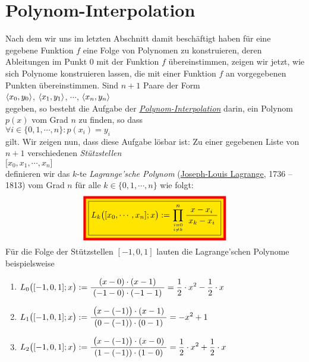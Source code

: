 \section{Polynom-Interpolation}
Nach dem wir uns im letzten Abschnitt damit besch\"aftigt haben f\"ur eine gegebene Funktion
$f$ eine Folge von Polynomen zu konstruieren, deren Ableitungen im Punkt $0$ mit der
Funktion $f$ \"ubereinstimmen, zeigen wir jetzt, wie sich Polynome konstruieren lassen, die
mit einer Funktion $f$ an vorgegebenen Punkten \"ubereinstimmen.  Sind $n+1$ Paare der Form
\\[0.2cm]
\hspace*{1.3cm}
$\pair(x_0,y_0)$,
$\pair(x_1,y_1)$,
$\cdots$,
$\pair(x_n,y_n)$
\\[0.2cm]
gegeben, so besteht die Aufgabe der
\href{https://de.wikipedia.org/wiki/Interpolation_(Mathematik)}{\emph{Polynom-Interpolation}} darin,
ein Polynom $p(x)$ vom Grad $n$ zu finden, so dass
\\[0.2cm]
\hspace*{1.3cm}
$\forall i \in \{0,1,\cdots,n\}: p(x_i) = y_i$
\\[0.2cm]
gilt.  Wir zeigen nun, dass diese Aufgabe l\"osbar ist:  Zu einer gegebenen Liste von 
$n+1$ verschiedenen \emph{St\"utzstellen} 
\\[0.2cm]
\hspace*{1.3cm}
$\bigl[x_0, x_1, \cdots, x_n]$
\\[0.2cm]
definieren wir das $k$-te \emph{Lagrange'sche Polynom} 
(\href{https://de.wikipedia.org/wiki/Joseph-Louis_Lagrange}{Joseph-Louis Lagrange}, 1736 -- 1813)
vom Grad $n$ f\"ur alle $k\in\{0,1,\cdots,n\}$ wie folgt: 
\begin{equation}
  \label{eq:lagrangePolynom}
\colorbox{red}{\colorbox{orange}{\framebox{$\ds L_k\bigl([x_0,\cdots,x_n];x\bigr) := \prod\limits_{i=0 \atop i\not=k}^n \bruch{x-x_i}{x_k-x_i}$}}}
\end{equation}
F\"ur die Folge der St\"utzstellen $[-1,0,1]$ lauten die Lagrange'schen Polynome beispielsweise
\begin{enumerate}
\item $L_0\bigl([-1,0,1];x\bigr) := \displaystyle\frac{\;\displaystyle(x-0)\cdot (x-1)\;}{\;\displaystyle(-1-0)\cdot (-1-1)\;} = 
       \frac{1}{2}\cdot x^2 - \frac{1}{2}\cdot x$ 
\item $L_1\bigl([-1,0,1];x\bigr) := \displaystyle\frac{\;\displaystyle\bigl(x-(-1)\bigr)\cdot (x-1)\;}{\;\displaystyle(0-(-1))\cdot (0-1)\;} = -x^2 + 1$
\item $L_2\bigl([-1,0,1];x\bigr) := \displaystyle\frac{\;\displaystyle\bigl(x-(-1)\bigr)\cdot (x-0)\;}{\;\displaystyle(1-(-1))\cdot (1-0)\;} = \frac{1}{2}\cdot x^2 + \frac{1}{2}\cdot x$
\end{enumerate}
